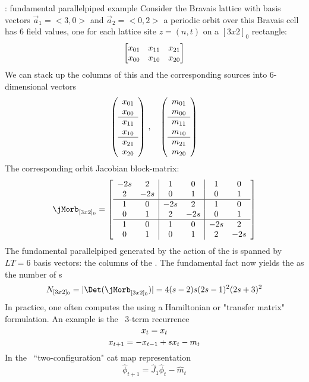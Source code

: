 \begin{description}
{\HillDet}: fundamental parallelpiped example
Consider the Bravais lattice with basis vectors $\vec{a}_1=<3,0>$ and $\vec{a}_2=<0,2>$ a periodic orbit over this Bravais cell has 6 field values, one for each lattice site $z=(n,t)$ on a $[3x2]_0$ rectangle:
$$\begin{bmatrix}
x_{01} & x_{11} & x_{21}\\
x_{00} & x_{10} & x_{20}
\end{bmatrix}
$$
We can stack up the columns of this {\lattstate} and the corresponding sources into 6-dimensional vectors
$$
\left(\begin{array}{c}
x_{01}\\
x_{00}\\
\hline
x_{11}\\
x_{10}\\
\hline
x_{21}\\
x_{20}
\end{array}\right)
\,,\quad
\left(\begin{array}{c}
m_{01}\\
m_{00}\\
\hline
m_{11}\\
m_{10}\\
\hline
m_{21}\\
m_{20}
\end{array}
\right)
$$
The corresponding orbit Jacobian block-matrix:
$$
\jMorb_{[3x2]_0}=\left[\begin{array}{cc|cc|cc}
-2s & 2 & 1 & 0 & 1 & 0\\
2 & -2s & 0 & 1 & 0 & 1\\
\hline
1 & 0 & -2s & 2 & 1 & 0\\
0 & 1 & 2 & -2s & 0 & 1\\
\hline
1 & 0 & 1 & 0 & -2s & 2\\
0 & 1 & 0 & 1 & 2 & -2s\\
\end{array}
\right]
$$
The fundamental parallelpiped generated by the action of the
{\jacobianOrb} is spanned by $LT=6$ basis vectors: the columns of the
{\jacobianOrb}. The fundamental fact now yields the {\HillDet} as the number of {\lattstate}s
$$N_{[3x2]_0}=|\Det(\jMorb_{[3x2]_0})|=4(s-2)s(2s-1)^2(2s+3)^2$$
In practice, one often computes the {\HillDet} using a Hamiltonian
or "transfer matrix" formulation. An example is the \templatt\ 3-term
recurrence
$$x_t=x_t$$
$$x_{t+1}=-x_{t-1}+sx_t-m_t$$
In the \PV\ ``two-configuration" cat map representation
$$\hat{\phi}_{t+1}=\hat{J}_1\hat{\phi}_t-\hat{m}_t$$

\end{description}
